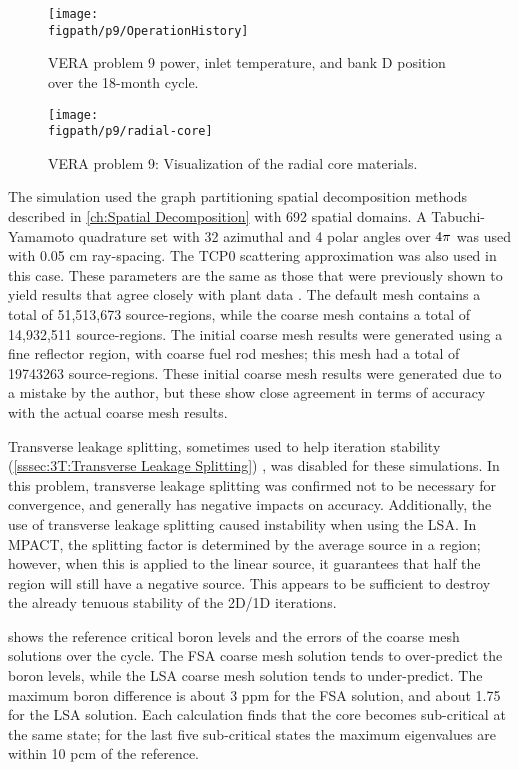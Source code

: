 {{{      \begin{figure}[h]
        \centering
        \texttt{[image: \\figpath/p9/OperationHistory]}
        \caption{VERA problem 9 power, inlet temperature, and bank D position over the 18-month cycle. \label{fig:LSMOC:P9:Operation}}
      \end{figure}

      \begin{figure}[h]
        \centering
        \texttt{[image: \\figpath/p9/radial-core]}
        \caption{VERA problem 9: Visualization of the radial core materials. \label{fig:LSMOC:P9:Radial Core}}
      \end{figure}

      The simulation used the graph partitioning spatial decomposition methods described in \cref{ch:Spatial Decomposition} with 692 spatial domains.
      A Tabuchi-Yamamoto quadrature set with 32 azimuthal and 4 polar angles over $4\pi$ was used with 0.05 cm ray-spacing.
      The TCP0 scattering approximation was also used in this case.
      These parameters are the same as those that were previously shown to yield results that agree closely with plant data \cite{VERA}.
      The default mesh contains a total of 51,513,673 source-regions, while the coarse mesh contains a total of 14,932,511 source-regions. %
      The initial coarse mesh results were generated using a fine reflector region, with coarse fuel rod meshes; this mesh had a total of 19743263 source-regions.
      These initial coarse mesh results were generated due to a mistake by the author, but these show close agreement in terms of accuracy with the actual coarse mesh results.

      Transverse leakage splitting, sometimes used to help iteration stability (\cref{sssec:3T:Transverse Leakage Splitting}) \cite{Stimpson2015,Kelley2015}, was disabled for these simulations.
      In this problem, transverse leakage splitting was confirmed not to be necessary for convergence, and generally has negative impacts on accuracy.
      Additionally, the use of transverse leakage splitting caused instability when using the \ac{LSA}.
      In MPACT, the splitting factor is determined by the average source in a region; however, when this is applied to the linear source, it guarantees that half the region will still have a negative source.
      This appears to be sufficient to destroy the already tenuous stability of the 2D/1D iterations.

       shows the reference critical boron levels and the errors of the coarse mesh solutions over the cycle.
      The \ac{FSA} coarse mesh solution tends to over-predict the boron levels, while the \ac{LSA} coarse mesh solution tends to under-predict.
      The maximum boron difference is about 3 ppm for the \ac{FSA} solution, and about 1.75 for the \ac{LSA} solution.
      Each calculation finds that the core becomes sub-critical at the same state; for the last five sub-critical states the maximum eigenvalues are within 10 pcm of the reference.

}}}
